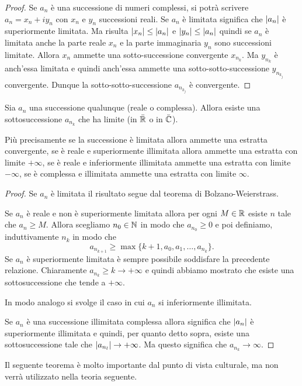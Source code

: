 \begin{proof}
Se $a_n$ è una successione di numeri complessi, si potrà scrivere
$a_n = x_n + i y_n$ con
$x_n$ e $y_n$ successioni reali. Se $a_n$ è limitata significa che ${\left|a_n\right|}$
è superiormente limitata. Ma risulta ${\left|x_n\right|} \le {\left|a_n\right|}$ e
${\left|y_n\right|}\le {\left|a_n\right|}$ quindi se $a_n$ è limitata anche la parte reale
$x_n$ e la parte immaginaria $y_n$ sono successioni limitate.
Allora $x_n$ ammette una sotto-successione convergente $x_{n_k}$.
Ma $y_{n_k}$ è anch'essa limitata e quindi anch'essa ammette una
sotto-sotto-successione $y_{n_{k_j}}$ convergente.
Dunque la sotto-sotto-successione $a_{n_{k_j}}$ è convergente.
\end{proof}

\begin{corollary}\label{cor:12394}
  Sia $a_n$ una successione qualunque (reale o complessa). Allora esiste
  una sottosuccessione $a_{n_k}$ che ha limite (in $\bar {\mathbb R}$ o in $\bar {\mathbb C}$).

  Più precisamente se la successione è limitata allora ammette una estratta convergente,
  se è reale e superiormente illimitata allora ammette
  una estratta con limite $+\infty$,
  se è reale e inferiormente illimitata ammette
  una estratta con limite $-\infty$,
  se è complessa e illimitata ammette
  una estratta con limite $\infty$.
\end{corollary}
%
\begin{proof}
  Se $a_n$ è limitata il risultato segue dal teorema di Bolzano-Weierstrass.

  Se $a_n$ è reale e non è superiormente limitata
  allora per ogni $M\in \mathbb R$ esiste $n$ tale che $a_n \ge M$.
  Allora scegliamo $n_0\in \mathbb N$ in modo che $a_{n_0}\ge 0$ e poi
  definiamo, induttivamente $n_k$ in modo che
  \[
   a_{n_{k+1}}\ge \max\{k+1, a_0, a_1, \dots, a_{n_k}\}.
  \]
  Se $a_n$ è superiormente limitata è sempre possibile soddisfare la precedente
  relazione. Chiaramente $a_{n_k} \ge k \to +\infty$ e quindi abbiamo
  mostrato che esiste una sottosuccessione che tende a $+\infty$.

  In modo analogo si svolge il caso in cui $a_n$ si inferiormente illimitata.

  Se $a_n$ è una successione illimitata complessa allora significa che
  ${\left|a_n\right|}$ è superiormente illimitata e quindi, per quanto detto sopra,
  esiste una sottosuccessione tale che ${\left|a_{n_l}\right|}\to +\infty$.
  Ma questo significa che $a_{n_k} \to \infty$.
\end{proof}

Il seguente teorema è molto importante dal punto di vista
culturale, ma non verrà utilizzato nella teoria seguente.

